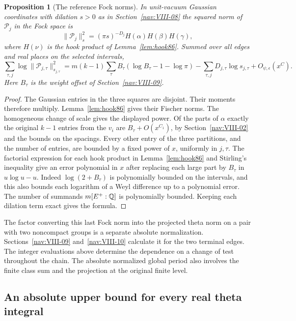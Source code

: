 \documentclass[a4paper,11pt]{article}
\newtheorem{proposition}{Proposition}[section]
\theoremstyle{definition}
\theoremstyle{remark}
\numberwithin{equation}{section}
\begin{document}
\begin{proposition}[The reference Fock norms]\leavevmode
\label{prop:fock187}
In unit-vacuum Gaussian coordinates with dilation \(s>0\)
as in Section~\ref{nav:VIII-08} the squared norm of \(\mathcal P_j\) in the Fock
space is
\[
    \|\mathcal P_j\|_s^2=(\pi s)^{-D_j} H(\alpha)H(\beta)H(\gamma),
\]
where \(H(\nu)\) is the hook product of Lemma~\ref{lem:hook86}.
Summed over all edges and real places on the selected intervals,
\[
 \sum_{\tau,j}\log\|\mathcal P_{j,\tau}\|^2_{s_{j,\tau}}
   =m(k-1)\sum_\tau B_\tau(\log B_\tau-1-\log\pi)
        -\sum_{\tau,j}D_{j,\tau}\log s_{j,\tau}
        +O_{\psi,\epsilon}(x^C).
\]
Here \(B_\tau\) is the weight offset of Section~\ref{nav:VIII-09}.
\end{proposition}
\begin{proof}
The Gaussian entries in the three squares are disjoint. Their moments therefore multiply. Lemma~\ref{lem:hook86} gives their Fischer
norms. The homogeneous change of scale gives the displayed power.
Of the parts of \(\alpha\) exactly the original \(k-1\) entries
from the \(v_i\) are \(B_\tau+O(x^{C_1})\), by Section~\ref{nav:VIII-02} and
the bounds on the spacings. Every other entry of the three
partitions, and the number of entries, are bounded by a fixed
power of \(x\), uniformly in \(j,\tau\). The factorial expression
for each hook product in Lemma~\ref{lem:hook86} and Stirling's
inequality give an error polynomial in \(x\) after replacing
each large part by \(B_\tau\) in \(u\log u-u\). Indeed
\(\log(2+B_\tau)\) is polynomially bounded on the intervals,
and this also bounds each logarithm of a Weyl difference up
to a polynomial error. The number of summands \(m[E^+:\mathbb Q]\)
is polynomially bounded. Keeping each dilation term exact gives
the formula.
\end{proof}

The factor converting this last Fock norm into the projected
theta norm on a pair with two noncompact groups is a separate
absolute normalization. Sections~\ref{nav:VIII-09} and~\ref{nav:VIII-10} calculate it for
the two terminal edges. The integer evaluations above determine
the dependence on a change of test throughout the chain. The
absolute normalized global period also involves the finite
class sum and the projection at the original finite level.

\subsection{An absolute upper bound for every real theta integral}\label{nav:VIII-12}
\label{sec:absolute189}
\end{document}
